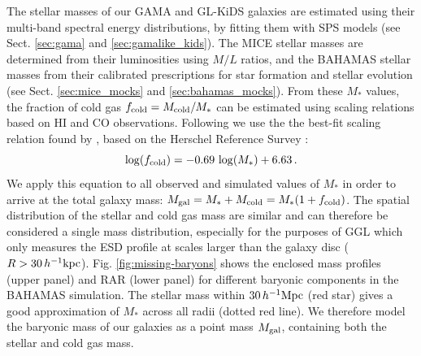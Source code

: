 \documentclass[usenatbib]{mnras}
\newcommand{\hkpc}{\, h^{-1}{\rm{kpc}} }
\newcommand{\hMpc}{\, h^{-1}{\rm{Mpc}} }
\newcommand{\un}[1]{_{\rm #1}}
\begin{document}
The stellar masses of our GAMA and GL-KiDS galaxies are estimated using their multi-band spectral energy distributions, by fitting them with SPS models (see Sect. \ref{sec:gama} and \ref{sec:gamalike_kids}). The MICE stellar masses are determined from their luminosities using \cite{bell2001} $M/L$ ratios, and the BAHAMAS stellar masses from their calibrated prescriptions for star formation and stellar evolution (see Sect. \ref{sec:mice_mocks} and \ref{sec:bahamas_mocks}). From these $M_*$ values, the fraction of cold gas $f\un{cold} = M\un{cold}/M_*$ can be estimated using scaling relations based on HI and CO observations. Following \cite{brouwer2017} we use the the best-fit scaling relation found by \cite{boselli2014}, based on the  Herschel Reference Survey \cite[]{boselli2010}:
\begin{equation}\label{eq:fcold}
	\log(f\un{cold}) = -0.69 \, \log(M_*) + 6.63 \, .
\end{equation}
We apply this equation to all observed and simulated values of $M_*$ in order to arrive at the total galaxy mass: $M\un{gal} = M_* + M\un{cold} = M_* (1 + f\un{cold})$. The spatial distribution of the stellar and cold gas mass are similar \cite[]{pohlen2010,crocker2011,cooper2012,davis2013} and can therefore be considered a single mass distribution, especially for the purposes of GGL which only measures the ESD profile at scales larger than the galaxy disc ($R>30\hkpc$). Fig. \ref{fig:missing-baryons} shows the enclosed mass profiles (upper panel) and RAR (lower panel) for different baryonic components in the BAHAMAS simulation. The stellar mass within $30 \hMpc$ (red star) gives a good approximation of $M_*$ across all radii (dotted red line). We therefore model the baryonic mass of our galaxies as a point mass $M\un{gal}$, containing both the stellar and cold gas mass.
\end{document}
